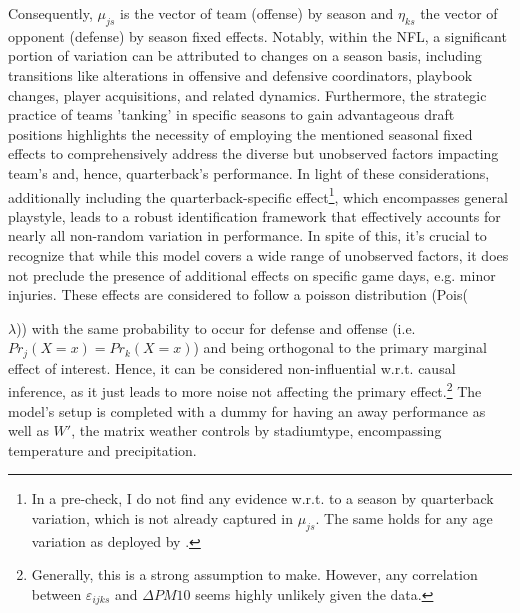 \documentclass[12pt,a4paper]{article}
\begin{document}
Consequently, $\mu_{js}$ is the vector of team (offense) by season and $\eta_{ks}$ the vector of opponent (defense) by season fixed effects. Notably, within the NFL, a significant portion of variation can be attributed to changes on a season basis, including transitions like alterations in offensive and defensive coordinators, playbook changes, player acquisitions, and related dynamics. Furthermore, the strategic practice of teams 'tanking' in specific seasons to gain advantageous draft positions highlights the necessity of employing the mentioned seasonal fixed effects to comprehensively address the diverse but unobserved factors impacting team's and, hence, quarterback's performance. In light of these considerations, additionally including the quarterback-specific effect\footnote{In a pre-check, I do not find any evidence w.r.t. to a season by quarterback variation, which is not already captured in $\mu_{js}$. The same holds for any age variation as deployed by \citet{heintz2022}.}, which encompasses general playstyle, leads to a robust identification framework that effectively accounts for nearly all non-random variation in performance. In spite of this, it's crucial to recognize that while this model covers a wide range of unobserved factors, it does not preclude the presence of additional effects on specific game days, e.g. minor injuries. These effects are considered to follow a poisson distribution (Pois({$\lambda$)) with the same probability to occur for defense and offense (i.e. $Pr_j(X=x) = Pr_k(X=x)$) and being orthogonal to the primary marginal effect of interest. Hence, it can be considered non-influential w.r.t. causal inference, as it just leads to more noise not affecting the primary effect.\footnote{Generally, this is a strong assumption to make. However, any correlation between $\varepsilon_{ijks}$ and $\Delta PM10$ seems highly unlikely given the data.} The model's setup is completed with a dummy for having an away performance as well as ${W'}$, the matrix weather controls by stadiumtype, encompassing temperature and precipitation.

}
\end{document}
